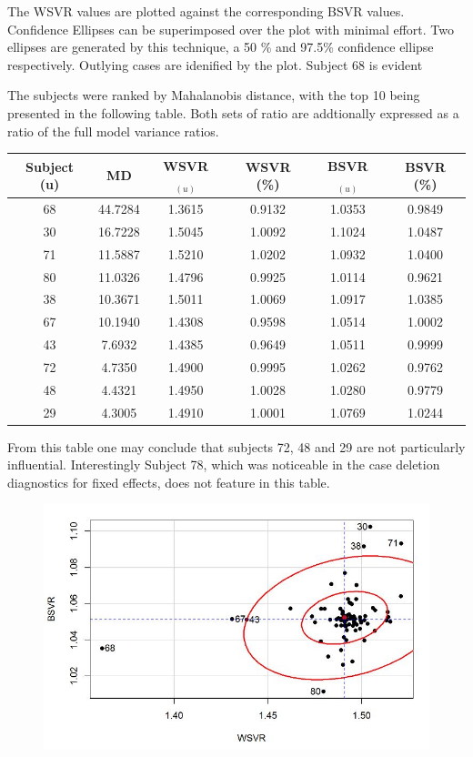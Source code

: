 \documentclass[12pt, a4paper]{report}
\theoremstyle{plain}
\theoremstyle{definition}
\theoremstyle{remark}
\begin{document}
The WSVR values are plotted against the corresponding BSVR values. Confidence Ellipses can be superimposed over the plot with minimal effort. Two ellipses are generated by this technique, a 50 \% and 97.5\% confidence ellipse respectively. Outlying cases are idenified by the plot. Subject 68 is evident

The subjects were ranked by Mahalanobis distance, with the top 10 being presented in the following table. Both sets of ratio are addtionally expressed as a ratio of the full model variance ratios. 
\begin{center}
	\begin{tabular}{|c|c|c|c|c|c|}
		\hline
		Subject (u) &  MD & WSVR$_{(u)}$ & WSVR (\%) & BSVR$_{(u)}$   & BSVR (\%)     \\ \hline \hline
		68 & 44.7284   & 1.3615  & 0.9132   & 1.0353  & 0.9849 \\ \hline
		30 & 16.7228   & 1.5045  & 1.0092   & 1.1024  & 1.0487 \\ \hline
		71 & 11.5887   & 1.5210  & 1.0202   & 1.0932  & 1.0400 \\ \hline
		80 & 11.0326   & 1.4796  & 0.9925   & 1.0114  & 0.9621 \\ \hline 
		38 & 10.3671   & 1.5011  & 1.0069   & 1.0917  & 1.0385 \\ \hline 
		67 & 10.1940   & 1.4308  & 0.9598   & 1.0514  & 1.0002 \\ \hline
		43  & 7.6932   & 1.4385  & 0.9649   & 1.0511  & 0.9999 \\ \hline
		72  & 4.7350   & 1.4900  & 0.9995   & 1.0262  & 0.9762 \\ \hline
		48  & 4.4321   & 1.4950  & 1.0028   & 1.0280  & 0.9779 \\ \hline
		29  & 4.3005   & 1.4910  & 1.0001   & 1.0769  & 1.0244 \\ \hline
	\end{tabular} 
\end{center}
From this table one may conclude that subjects 72, 48 and 29 are not particularly influential. Interestingly Subject 78, which was noticeable in the case deletion diagnostics for fixed effects, does not feature in this table.

\begin{figure}[h!]
	\centering
	\includegraphics[width=0.9\linewidth]{08-plot1}
	\caption{}
	\label{fig:08-plot1}
\end{figure}
\end{document}
